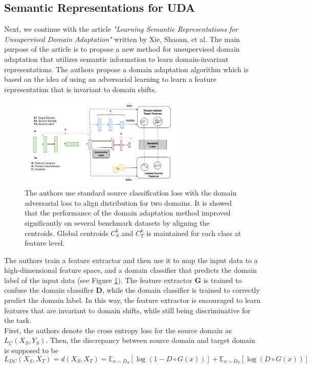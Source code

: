 \subsection{Semantic Representations for UDA}
Next, we continue with the article \textit{"Learning Semantic Representations for Unsupervised Domain Adaptation"} written by Xie, Shaoan, et al. \cite{xie2018learning} The main purpose of the article is to propose a new method for unsupervised domain adaptation that utilizes semantic information to learn domain-invariant representations. The authors propose a domain adaptation algorithm which is based on the idea of using an adversarial learning to learn a feature representation that is invariant to domain shifts. 

\begin{figure}[H]
    \centering
    \includegraphics[width=0.7\textwidth]{Figures/From articles/sem_rep.png}
    \caption{The authors use standard source classification loss with the domain adversarial loss to align distribution for two domains. It is showed that the performance of the domain adaptation method improved significantly on several benchmark datasets by aligning the centroids. Global centroids $C_S^k$ and $C_T^k$ is maintained for each class at feature level.}
    \label{fig: sem_rep}
\end{figure}

 The authors train a feature extractor and then use it to map the input data to a high-dimensional feature space, and a domain classifier that predicts the domain label of the input data (see Figure \ref{fig: sem_rep}). The feature extractor \textbf{G} is trained to confuse the domain classifier \textbf{D}, while the domain classifier is trained to correctly predict the domain label. In this way, the feature extractor is encouraged to learn features that are invariant to domain shifts, while still being discriminative for the task.\\

 
 First, the authors denote the cross entropy loss for the source domain as $L_C(X_S, Y_S)$. Then, the discrepancy between source domain and target domain is supposed to be 
\begin{equation}
 L_{DC}(X_S, X_T) = d(X_S, X_T) = \mathbb{E}_{x \sim D_S} [\log(1 - D \circ G(x))] + \mathbb{E}_{x \sim D_T} [\log(D \circ G(x))] 
\end{equation} 

